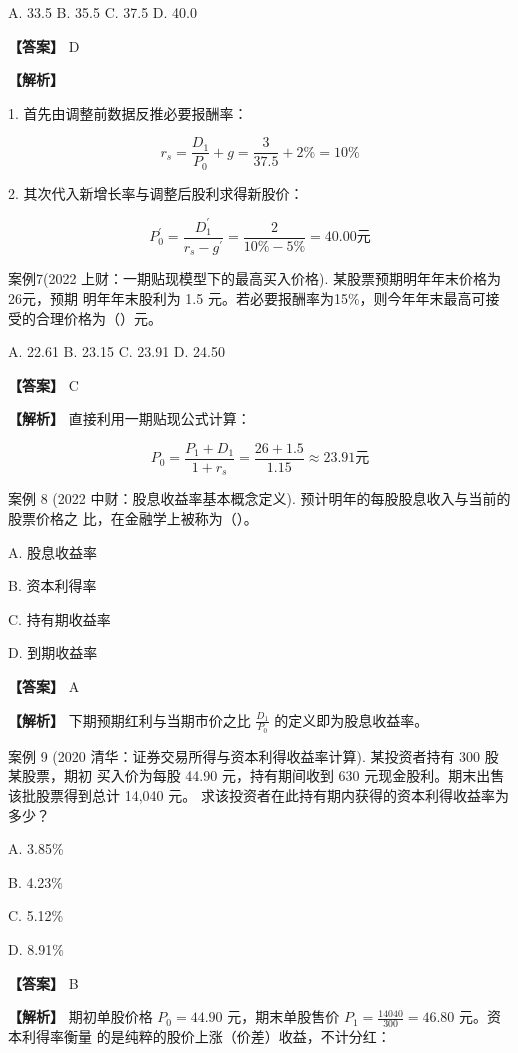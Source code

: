 \documentclass[lang=cn,10pt,color=blue]{elegantbook}
\begin{document}
A. 33.5 B. 35.5 C. 37.5 D. 40.0 

\textbf{\color{UnivColor} 【答案】} D 

\textbf{\color{UnivColor} 【解析】} 

1. 首先由调整前数据反推必要报酬率： 

$$
r _ {s} = \frac {D _ {1}}{P _ {0}} + g = \frac {3}{37.5} + 2 \% = 10 \%
$$

2. 其次代入新增长率与调整后股利求得新股价： 

$$
P _ {0} ^ {\prime} = \frac {D _ {1} ^ {\prime}}{r _ {s} - g ^ {\prime}} = \frac {2}{10\% - 5\%} = 40.00 \text{元}
$$

案例7(2022 上财：一期贴现模型下的最高买入价格). 某股票预期明年年末价格为26元，预期 明年年末股利为 1.5 元。若必要报酬率为15\%，则今年年末最高可接受的合理价格为（）元。 

A. 22.61 B. 23.15 C. 23.91 D. 24.50 

\textbf{\color{UnivColor} 【答案】} C 

\textbf{\color{UnivColor} 【解析】} 直接利用一期贴现公式计算： 

$$
P _ {0} = \frac {P _ {1} + D _ {1}}{1 + r _ {s}} = \frac {2 6 + 1 . 5}{1 . 1 5} \approx 2 3. 9 1 \text {元}
$$

案例 8 (2022 中财：股息收益率基本概念定义). 预计明年的每股股息收入与当前的股票价格之 比，在金融学上被称为（）。 

A. 股息收益率 

B. 资本利得率 

C. 持有期收益率 

D. 到期收益率 

\textbf{\color{UnivColor} 【答案】} A 

\textbf{\color{UnivColor} 【解析】} 下期预期红利与当期市价之比 $\frac { D _ { 1 } } { P _ { 0 } }$ 的定义即为股息收益率。 

案例 9 (2020 清华：证券交易所得与资本利得收益率计算). 某投资者持有 300 股某股票，期初 买入价为每股 44.90 元，持有期间收到 630 元现金股利。期末出售该批股票得到总计 14,040 元。 求该投资者在此持有期内获得的资本利得收益率为多少？ 

A. 3.85\% 

B. 4.23\% 

C. 5.12\% 

D. 8.91\% 

\textbf{\color{UnivColor} 【答案】} B 

\textbf{\color{UnivColor} 【解析】} 期初单股价格 $P _ { 0 } = 4 4 . 9 0$ 元，期末单股售价 $\displaystyle P _ { 1 } = \frac { 1 4 0 4 0 } { 3 0 0 } = 4 6 . 8 0$ 元。资本利得率衡量 的是纯粹的股价上涨（价差）收益，不计分红： 
\end{document}
